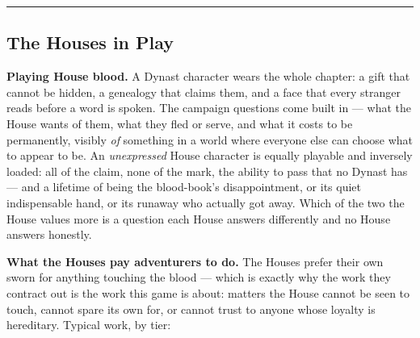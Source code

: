 \medskip\hrule\medskip

\subsection{The Houses in Play}

\textbf{Playing House blood.} A Dynast character wears the whole chapter: a gift that cannot be hidden, a genealogy that claims them, and a face that every stranger reads before a word is spoken. The campaign questions come built in --- what the House wants of them, what they fled or serve, and what it costs to be permanently, visibly \textit{of} something in a world where everyone else can choose what to appear to be. An \textit{unexpressed} House character is equally playable and inversely loaded: all of the claim, none of the mark, the ability to pass that no Dynast has --- and a lifetime of being the blood-book's disappointment, or its quiet indispensable hand, or its runaway who actually got away. Which of the two the House values more is a question each House answers differently and no House answers honestly.

\textbf{What the Houses pay adventurers to do.} The Houses prefer their own sworn for anything touching the blood --- which is exactly why the work they contract out is the work this game is about: matters the House cannot be seen to touch, cannot spare its own for, or cannot trust to anyone whose loyalty is hereditary. Typical work, by tier:

